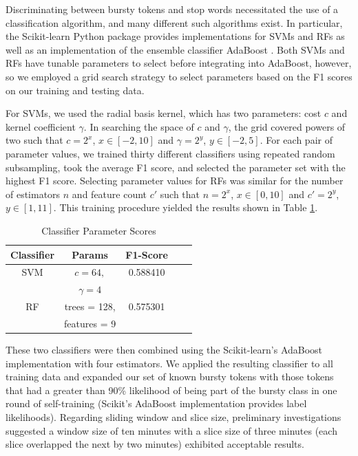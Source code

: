 \documentclass{sig-alternate}
\begin{document}
Discriminating between bursty tokens and stop words necessitated the use of a classification algorithm, and many different such algorithms exist.
In particular, the Scikit-learn Python package provides implementations for SVMs and RFs as well as an implementation of the ensemble classifier AdaBoost \cite{scikit-learn}.
Both SVMs and RFs have tunable parameters to select before integrating into AdaBoost, however, so we employed a grid search strategy to select parameters based on the F1 scores on our training and testing data.

For SVMs, we used the radial basis kernel, which has two parameters: cost $c$ and kernel coefficient $\gamma$.
In searching the space of $c$ and $\gamma$, the grid covered powers of two such that $c = 2^x$, $x \in [-2, 10]$ and $\gamma = 2^y$, $y \in [-2, 5]$.
For each pair of parameter values, we trained thirty different classifiers using repeated random subsampling, took the average F1 score, and selected the parameter set with the highest F1 score.
Selecting parameter values for RFs was similar for the number of estimators $n$ and feature count $c'$ such that $n = 2^x$, $x \in [0, 10]$ and $c' = 2^y$, $y \in [1, 11]$.
This training procedure yielded the results shown in Table \ref{tab:scores}.

\begin{table}[htdp]
\caption{Classifier Parameter Scores}
\begin{center}
\begin{tabular}{|c|c|c|c|c|}
\hline
\textbf{Classifier} & \textbf{Params} & \textbf{F1-Score} \\ \hline
SVM & $c=64,$ & 0.588410 \\ 
& $\gamma=4$ & \\ \hline
RF & trees = 128, & 0.575301 \\
& features = 9 &  \\ \hline
\end{tabular}
\end{center}
\label{tab:scores}
\end{table}

These two classifiers were then combined using the Scikit-learn's AdaBoost implementation with four estimators.
We applied the resulting classifier to all training data and expanded our set of known bursty tokens with those tokens that had a greater than 90\% likelihood of being part of the bursty class in one round of self-training (Scikit's AdaBoost implementation provides label likelihoods).
Regarding sliding window and slice size, preliminary investigations suggested a window size of ten minutes with a slice size of three minutes (each slice overlapped the next by two minutes) exhibited acceptable results.
\end{document}
